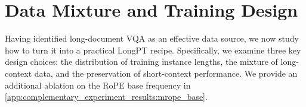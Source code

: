 \section{Data Mixture and Training Design}
\label{sec:mixing}
Having identified long-document VQA as an effective data source, we now study how to turn it into a practical LongPT recipe.
Specifically, we examine three key design choices: the distribution of training instance lengths, the mixture of long-context data, and the preservation of short-context performance.
We provide an additional ablation on the RoPE base frequency in \cref{app:complementary_experiment_results:mrope_base}.


\begin{table}[t]
    \centering
    \caption{Long-context data mixture test. We grid search the mix of information extraction vs.\ reasoning tasks from $0:10$ to $10:0$ under the fixed 5B-token budget. \textbf{Ratio} represents the extraction-to-reasoning ratio.}
    \label{tab:extract_reason_ratio}
    \setlength{\tabcolsep}{4pt}
\end{table}

